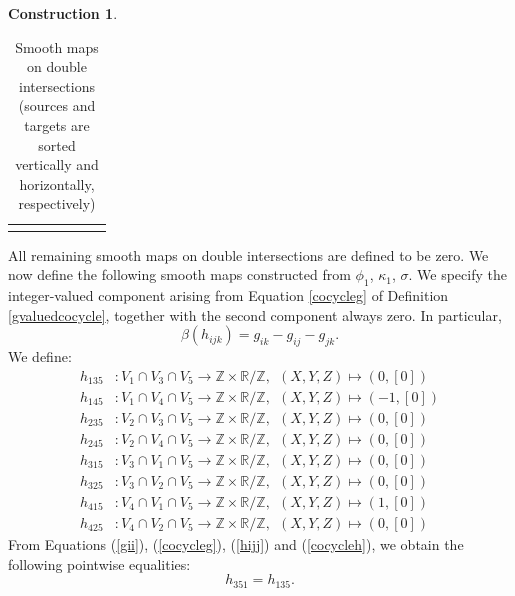 \documentclass{article}
\theoremstyle{plain}
\theoremstyle{definition}
\newtheorem{const}[thm]{Construction}
\begin{document}
\begin{const}
\begin{table}[H]
\begin{center}
{\begin{tabular}{c || c | c | c | c | c | c}
& & & & & \cellcolor{gray!20!white} &
\end{tabular}
}
\end{center}
\caption{Smooth maps on double intersections (sources and targets are sorted vertically and horizontally, respectively)}
\end{table}
All remaining smooth maps on double intersections are defined to be zero. We now define the following smooth maps constructed from $\phi_1$, $\kappa_1$, $\sigma$. We specify the integer-valued component arising from Equation \ref{cocycleg} of Definition \ref{gvaluedcocycle}, together with the second component always zero. In particular,
\[
\beta(h_{ijk}) = g_{ik} - g_{ij} - g_{jk}.
\]
We define:
\begin{align*}
h_{1 3 5} & : V_1 \cap V_3 \cap V_5 \longrightarrow \mathbb{Z} \times \mathbb{R}/\mathbb{Z}, ~~ (X,Y,Z) \mapsto \left(0,\left[0\right]\right) \\
h_{1 4 5} & : V_1 \cap V_4 \cap V_5 \longrightarrow \mathbb{Z} \times \mathbb{R}/\mathbb{Z}, ~~ (X,Y,Z) \mapsto \left(-1,\left[0\right]\right) \\
h_{2 3 5} & : V_2 \cap V_3 \cap V_5 \longrightarrow \mathbb{Z} \times \mathbb{R}/\mathbb{Z}, ~~ (X,Y,Z) \mapsto \left(0,\left[0\right]\right) \\
h_{2 4 5} & : V_2 \cap V_4 \cap V_5 \longrightarrow\mathbb{Z} \times \mathbb{R}/\mathbb{Z}, ~~ (X,Y,Z) \mapsto \left(0,\left[0\right]\right) \\
h_{3 1 5} & : V_3 \cap V_1 \cap V_5 \longrightarrow \mathbb{Z} \times \mathbb{R}/\mathbb{Z}, ~~ (X,Y,Z) \mapsto \left(0,\left[0\right]\right) \\
h_{3 2 5} & : V_3 \cap V_2 \cap V_5 \longrightarrow \mathbb{Z} \times \mathbb{R}/\mathbb{Z}, ~~ (X,Y,Z) \mapsto \left(0,\left[0\right]\right) \\
h_{4 1 5} & : V_4 \cap V_1 \cap V_5 \longrightarrow \mathbb{Z} \times \mathbb{R}/\mathbb{Z}, ~~ (X,Y,Z) \mapsto \left(1,\left[0\right]\right) \\
h_{4 2 5} & : V_4 \cap V_2 \cap V_5 \longrightarrow \mathbb{Z} \times \mathbb{R}/\mathbb{Z}, ~~ (X,Y,Z) \mapsto \left(0,\left[0\right]\right)
\end{align*}
From Equations (\ref{gii}), (\ref{cocycleg}), (\ref{hijj}) and (\ref{cocycleh}), we obtain the following pointwise equalities:
\begin{equation}\label{h231h123}
h_{3 5 1} = h_{1 3 5}.
\end{equation}
\begin{equation}\label{h312h321}

\end{equation}
\end{const}
\end{document}
